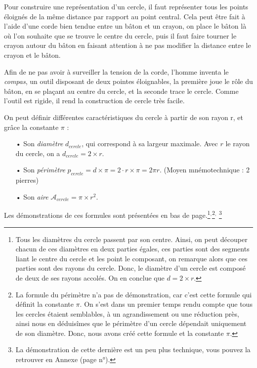 \documentclass[a4paper, twoside]{article}
\begin{document}
Pour construire une représentation d'un cercle,
il faut représenter tous les points éloignés de la même distance par rapport au point central.
Cela peut être fait à l'aide d'une corde bien tendue entre un bâton et un crayon,
on place le bâton là où l'on souhaite que se trouve le centre du cercle,
puis il faut faire tourner le crayon autour du bâton en faisant attention à ne pas modifier
la distance entre le crayon et le bâton.

Afin de ne pas avoir à surveiller la tension de la corde, l'homme inventa le \emph{compas},
un outil disposant de deux pointes éloignables, la première joue le rôle du bâton,
en se plaçant au centre du cercle, et la seconde trace le cercle.
Comme l'outil est rigide, il rend la construction de cercle très facile.

\medbreak

On peut définir différentes caractéristiques du cercle à partir de son rayon r,
et grâce la constante $\pi$ :

\medbreak

\begin{itemize}
	\item[•] Son \emph{diamètre} $d_{cercle}$, qui correspond à sa largeur maximale.
	      Avec $r$ le rayon du cercle, on a $d_{cercle} = 2 \times r$.
	      \smallbreak
	\item[•] Son \emph{périmètre} $p_{cercle} = d \times \pi = 2 \cdot r \times \pi = 2 \pi r$. (Moyen mnémotechnique : 2 pierres)
	      \smallbreak
	\item[•] Son \emph{aire} $\mathcal{A}_{cercle} = \pi \times r^2$.
\end{itemize}

\medbreak

Les démonstrations de ces formules sont présentées en bas de page.\footnote{
	Tous les diamètres du cercle passent par son centre.
	Ainsi, on peut découper chacun de ces diamètres en deux parties égales,
	ces parties sont des segments liant le centre du cercle et les point le composant,
	on remarque alors que ces parties sont des rayons du cercle.
	Donc, le diamètre d'un cercle est composé de deux de ses rayons accolés. On en conclue que $d = 2 \times r$.}$^{, }$\footnote{
	La formule du périmètre n'a pas de démonstration,
	car c'est cette formule qui définit la constante $\pi$.
	On s'est dans un premier temps rendu compte que tous les cercles étaient semblables,
	à un agrandissement ou une réduction près, ainsi nous en déduisîmes que le périmètre d'un cercle
	dépendait uniquement de son diamètre.
	Donc, nous avons créé cette
	formule et la constante
	$\pi$.}$^{, }$
\footnote{
	La démonstration de cette dernière est un peu plus technique,
	vous pouvez la retrouver en Annexe (page n°\pageref{demo_formule_aire_cercle}).}
\end{document}
